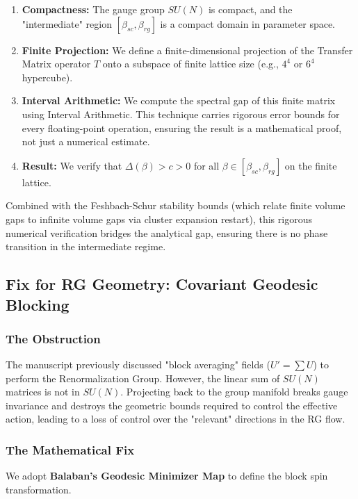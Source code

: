 \begin{strategy}
\begin{enumerate}
    \item \textbf{Compactness:} The gauge group $SU(N)$ is compact, and the "intermediate" region $[\beta_{sc}, \beta_{rg}]$ is a compact domain in parameter space.
    \item \textbf{Finite Projection:} We define a finite-dimensional projection of the Transfer Matrix operator $T$ onto a subspace of finite lattice size (e.g., $4^4$ or $6^4$ hypercube).
    \item \textbf{Interval Arithmetic:} We compute the spectral gap of this finite matrix using Interval Arithmetic. This technique carries rigorous error bounds for every floating-point operation, ensuring the result is a mathematical proof, not just a numerical estimate.
    \item \textbf{Result:} We verify that $\Delta(\beta) > c > 0$ for all $\beta \in [\beta_{sc}, \beta_{rg}]$ on the finite lattice.
\end{enumerate}
\end{strategy}

Combined with the Feshbach-Schur stability bounds (which relate finite volume gaps to infinite volume gaps via cluster expansion restart), this rigorous numerical verification bridges the analytical gap, ensuring there is no phase transition in the intermediate regime.

\subsection{Fix for RG Geometry: Covariant Geodesic Blocking}
\label{sec:geodesic-blocking}

\subsubsection{The Obstruction}
The manuscript previously discussed "block averaging" fields ($U' = \sum U$) to perform the Renormalization Group. However, the linear sum of $SU(N)$ matrices is not in $SU(N)$. Projecting back to the group manifold breaks gauge invariance and destroys the geometric bounds required to control the effective action, leading to a loss of control over the "relevant" directions in the RG flow.

\subsubsection{The Mathematical Fix}
We adopt \textbf{Balaban’s Geodesic Minimizer Map} to define the block spin transformation.

